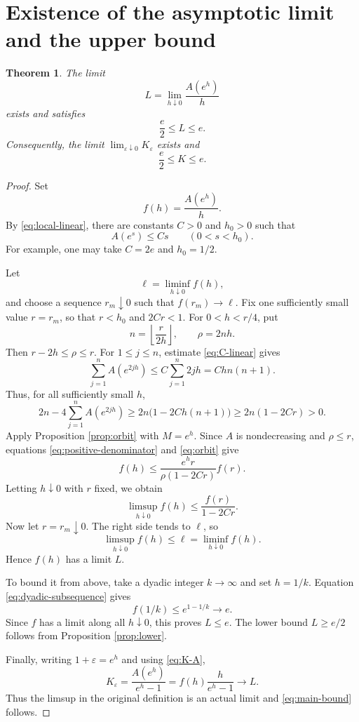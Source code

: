 \documentclass[11pt]{article}
\newtheorem{theorem}{Theorem}[section]
\theoremstyle{remark}
\newcommand{\eps}{\varepsilon}
\begin{document}
\section{Existence of the asymptotic limit and the upper bound}

\begin{theorem}\label{thm:main}
The limit
\[
 L=\lim_{h\downarrow0}\frac{A(e^h)}h
\]
exists and satisfies
\[
 \frac e2\le L\le e.
\]
Consequently, the limit $\lim_{\eps\downarrow0}K_{\eps}$ exists and
\begin{equation}\label{eq:main-bound}
 \boxed{\frac e2\le K\le e}.
\end{equation}
\end{theorem}

\begin{proof}
Set
\[
 f(h)=\frac{A(e^h)}h.
\]
By \eqref{eq:local-linear}, there are constants $C>0$ and $h_0>0$ such
that
\begin{equation}\label{eq:C-linear}
 A(e^s)\le Cs\qquad(0<s<h_0).
\end{equation}
For example, one may take $C=2e$ and $h_0=1/2$.

Let
\[
 \ell=\liminf_{h\downarrow0}f(h),
\]
and choose a sequence $r_m\downarrow0$ such that $f(r_m)\to\ell$.
Fix one sufficiently small value $r=r_m$, so that
$r<h_0$ and $2Cr<1$.  For $0<h<r/4$, put
\[
 n=\left\lfloor\frac r{2h}\right\rfloor,
 \qquad \rho=2nh.
\]
Then $r-2h\le\rho\le r$.  For $1\le j\le n$, estimate
\eqref{eq:C-linear} gives
\[
 \sum_{j=1}^nA(e^{2jh})
 \le C\sum_{j=1}^n2jh
 =Chn(n+1).
\]
Thus, for all sufficiently small $h$,
\begin{equation}\label{eq:positive-denominator}
 2n-4\sum_{j=1}^nA(e^{2jh})
 \ge2n\bigl(1-2Ch(n+1)\bigr)
 \ge2n(1-2Cr)>0.
\end{equation}
Apply Proposition \ref{prop:orbit} with $M=e^h$.  Since $A$ is
nondecreasing and $\rho\le r$, equations
\eqref{eq:positive-denominator} and \eqref{eq:orbit} give
\[
 f(h)
 \le \frac{e^h r}{\rho(1-2Cr)}f(r).
\]
Letting $h\downarrow0$ with $r$ fixed, we obtain
\[
 \limsup_{h\downarrow0}f(h)\le\frac{f(r)}{1-2Cr}.
\]
Now let $r=r_m\downarrow0$.  The right side tends to $\ell$, so
\[
 \limsup_{h\downarrow0}f(h)\le\ell
 =\liminf_{h\downarrow0}f(h).
\]
Hence $f(h)$ has a limit $L$.

To bound it from above, take a dyadic integer $k\to\infty$ and set
$h=1/k$.  Equation \eqref{eq:dyadic-subsequence} gives
\[
 f(1/k)\le e^{1-1/k}\longrightarrow e.
\]
Since $f$ has a limit along all $h\downarrow0$, this proves $L\le e$.
The lower bound $L\ge e/2$ follows from Proposition \ref{prop:lower}.

Finally, writing $1+\eps=e^h$ and using \eqref{eq:K-A},
\[
 K_{\eps}
 =\frac{A(e^h)}{e^h-1}
 =f(h)\frac{h}{e^h-1}
 \longrightarrow L.
\]
Thus the limsup in the original definition is an actual limit and
\eqref{eq:main-bound} follows.
\end{proof}
\end{document}
